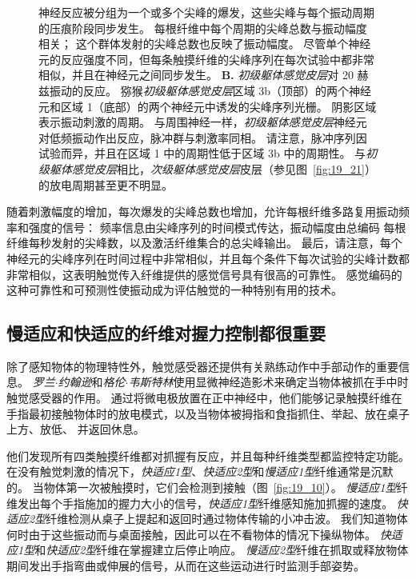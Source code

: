 \begin{figure}[htbp]
{		神经反应被分组为一个或多个尖峰的爆发，这些尖峰与每个振动周期的压痕阶段同步发生。
		每根纤维中每个周期的尖峰总数与振动幅度相关； 这个群体发射的尖峰总数也反映了振动幅度。
		尽管单个神经元的反应强度不同，但每条触摸纤维的尖峰序列在每次试验中都非常相似，并且在神经元之间同步发生\cite{muniak2007neural}。
		\textbf{B.} \textit{初级躯体感觉皮层}对 20 赫兹振动的反应。
		猕猴\textit{初级躯体感觉皮层}区域 3b（顶部）的两个神经元和区域 1（底部）的两个神经元中诱发的尖峰序列光栅。
		阴影区域表示振动刺激的周期。
		与周围神经一样，\textit{初级躯体感觉皮层}神经元对低频振动作出反应，脉冲群与刺激率同相。
		请注意，脉冲序列因试验而异，并且在区域 1 中的周期性低于区域 3b 中的周期性。
		与\textit{初级躯体感觉皮层}相比，\textit{次级躯体感觉皮层}皮层（参见图~\ref{fig:19_21}）的放电周期甚至更不明显\cite{salinas2000periodicity}。}
	\label{fig:19_9}
\end{figure}


随着刺激幅度的增加，每次爆发的尖峰总数也增加，允许每根纤维多路复用振动频率和强度的信号：
频率信息由尖峰序列的时间模式传达，振动幅度由总编码 每根纤维每秒发射的尖峰数，以及激活纤维集合的总尖峰输出。
最后，请注意，每个神经元的尖峰序列在时间过程中非常相似，并且每个条件下每次试验的尖峰计数都非常相似，这表明触觉传入纤维提供的感觉信号具有很高的可靠性。 
感觉编码的这种可靠性和可预测性使振动成为评估触觉的一种特别有用的技术。



\subsection{慢适应和快适应的纤维对握力控制都很重要}

除了感知物体的物理特性外，触觉感受器还提供有关熟练动作中手部动作的重要信息。
\textit{罗兰$\cdot$约翰逊}和\textit{格伦$\cdot$韦斯特林}使用显微神经造影术来确定当物体被抓在手中时触觉感受器的作用。
通过将微电极放置在正中神经中，他们能够记录触摸纤维在手指最初接触物体时的放电模式，以及当物体被拇指和食指抓住、举起、放在桌子上方、放低、 并返回休息。


他们发现所有四类触摸纤维都对抓握有反应，并且每种纤维类型都监控特定功能。
在没有触觉刺激的情况下，\textit{快适应1型}、\textit{快适应2型}和\textit{慢适应1型}纤维通常是沉默的。
当物体第一次被触摸时，它们会检测到接触（图~\ref{fig:19_10}）。
\textit{慢适应1型}纤维发出每个手指施加的握力大小的信号，\textit{快适应1型}纤维感知施加抓握的速度。
\textit{快适应2型}纤维检测从桌子上提起和返回时通过物体传输的小冲击波。
我们知道物体何时由于这些振动而与桌面接触，因此可以在不看物体的情况下操纵物体。
\textit{快适应1型}和\textit{快适应2型}纤维在掌握建立后停止响应。
\textit{慢适应2型}纤维在抓取或释放物体期间发出手指弯曲或伸展的信号，从而在这些运动进行时监测手部姿势。


